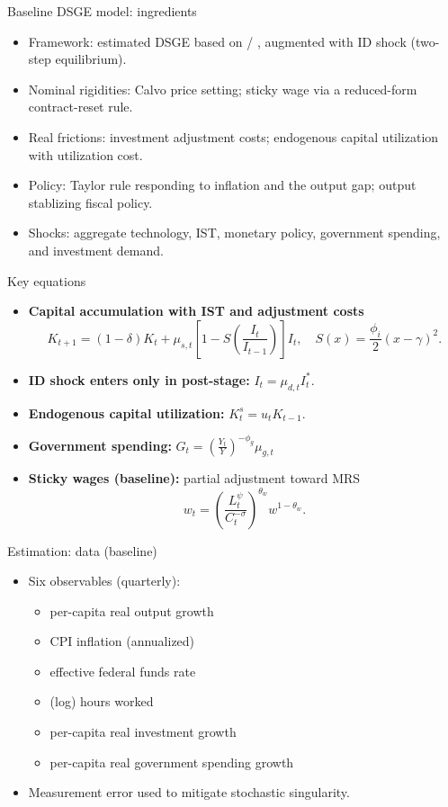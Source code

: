 \documentclass[10pt]{beamer}
\begin{document}
\begin{frame}{Baseline DSGE model: ingredients}
	\begin{itemize}
		\item Framework: estimated DSGE based on \citealp{smetsShocksFrictionsUS2007} / \citealp{herbstBayesianEstimationDSGE2015}, augmented with ID shock (two-step equilibrium).
		\item Nominal rigidities: Calvo price setting; sticky wage via a reduced-form contract-reset rule.
		\item Real frictions: investment adjustment costs; endogenous capital utilization with utilization cost.
		\item Policy: Taylor rule responding to inflation and the output gap; output stablizing fiscal policy.
		\item Shocks: aggregate technology, IST, monetary policy, government spending, and investment demand.
	\end{itemize}
\end{frame}

\begin{frame}{Key equations}
	\small
	\begin{itemize}
		\item \textbf{Capital accumulation with IST and adjustment costs}
			\[
				K_{t+1} = (1-\delta)K_t + \mu_{s,t}\left[1-S\left(\frac{I_t}{I_{t-1}}\right)\right] I_t,
				\quad S(x)=\frac{\phi_i}{2}(x-\gamma)^2.
			\]
		\item \textbf{ID shock enters only in post-stage:} $I_t=\mu_{d,t} I_t^*$.
		\item \textbf{Endogenous capital utilization:} $K_t^s = u_t K_{t-1}$.
		\item \textbf{Government spending:} $G_t = \left(\frac{Y_t}{Y}\right)^{-\phi_g}\mu_{g, t}$
		\item \textbf{Sticky wages (baseline):} partial adjustment toward MRS
			\[
				w_t = \left(\frac{L_t^{\psi}}{C_t^{-\sigma}}\right)^{\theta_w} w^{1-\theta_w}.
			\]
	\end{itemize}
\end{frame}

\begin{frame}{Estimation: data (baseline)}
	\begin{itemize}
		\item Six observables (quarterly):
			\begin{itemize}
				\item per-capita real output growth
				\item CPI inflation (annualized)
				\item effective federal funds rate
				\item (log) hours worked
				\item per-capita real investment growth
				\item per-capita real government spending growth
			\end{itemize}
		\item Measurement error used to mitigate stochastic singularity.
	\end{itemize}
\end{frame}
\end{document}
